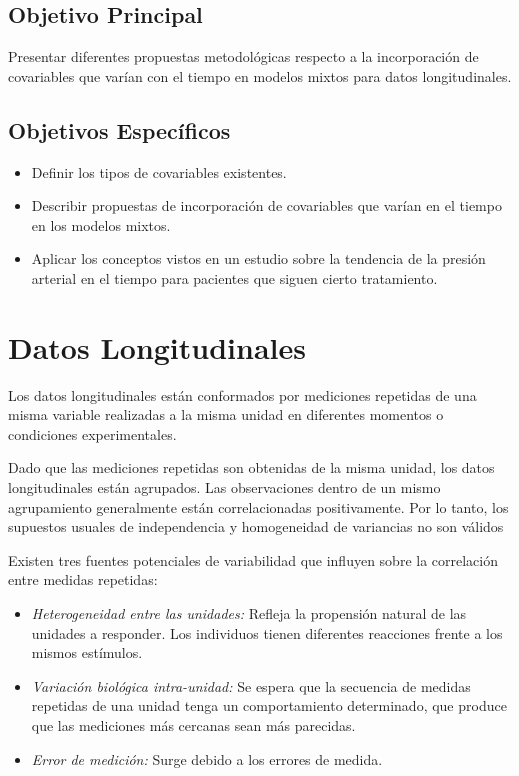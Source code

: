 \documentclass[spanish]{article}
\numberwithin{figure}{subsection}
\numberwithin{equation}{subsection}
\numberwithin{table}{subsection}
\begin{document}
\subsection{Objetivo Principal}

Presentar diferentes propuestas metodológicas respecto a la incorporación de
covariables que varían con el tiempo en modelos mixtos para datos
longitudinales.

\subsection{Objetivos Específicos}

\begin{itemize}
	\item Definir los tipos de covariables existentes.
	\item Describir propuestas de incorporación de covariables que varían en el
	tiempo en los modelos mixtos.
	\item Aplicar los conceptos vistos en un estudio sobre la tendencia de la
		  presión arterial en el tiempo para pacientes que siguen cierto
		  tratamiento.
\end{itemize}

\newpage
\section{Datos Longitudinales}

Los datos longitudinales están conformados por mediciones repetidas de una misma
variable realizadas a la misma unidad en diferentes momentos o condiciones
experimentales.

Dado que las mediciones repetidas son obtenidas de la misma unidad, los datos
longitudinales están agrupados. Las observaciones dentro de un mismo
agrupamiento generalmente están correlacionadas positivamente. Por lo tanto, los
supuestos usuales de independencia y homogeneidad de variancias no son válidos

Existen tres fuentes potenciales de variabilidad que influyen sobre la
correlación entre medidas repetidas:

\begin{itemize}
	\item \textit{Heterogeneidad entre las unidades:} Refleja la propensión
	natural de las unidades a responder. Los individuos tienen diferentes
	reacciones frente a los mismos estímulos.
	\item \textit{Variación biológica intra-unidad:} Se espera que la secuencia
	de medidas repetidas de una unidad tenga un comportamiento determinado, que
	produce que las mediciones más cercanas sean más parecidas.
	\item \textit{Error de medición:} Surge debido a los errores de medida.
\end{itemize}
\end{document}
